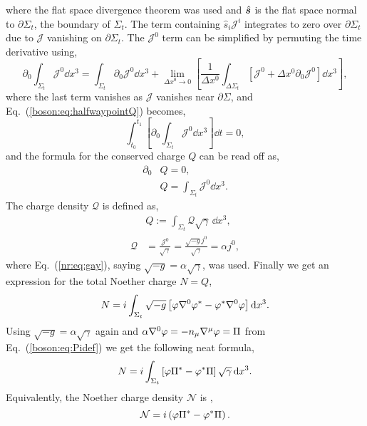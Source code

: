 where the flat space divergence theorem was used and $\hat{\boldsymbol{s}}$ is the flat space normal to $\partial \Sigma_t$, the boundary of $\Sigma_t$. The term containing $\hat{s}_i\mathcal{J}^i$ integrates to zero over $\partial \Sigma_t$ due to $\mathcal{J}$ vanishing on $\partial \Sigma_t$. The $\mathcal{J}^0$ term can be simplified by permuting the time derivative using,
\begin{equation} 
\partial_0 \int_{\Sigma_t}\mathcal{J}^0 \dd x^3 = \int_{\Sigma_t}\partial_0 \mathcal{J}^0 \dd x^3 + \lim_{\Delta x^0\rightarrow0}\left[ \frac{1}{\Delta x^0}\int_{\Delta \Sigma_t}\left[ \mathcal{J}^0 +\Delta x^0 \partial_0 \mathcal{J}^0\right] \dd x^3 \right],
\end{equation}
where the last term vanishes as $\mathcal{J}$ vanishes near $\partial\Sigma$, and Eq.~(\ref{boson:eq:halfwaypointQ}) becomes,
\begin{equation} 
\int^{t_1}_{t_0}\left[\partial_0 \int_{\Sigma_t} \mathcal{J}^0 \dd x^3 \right]\dd t = 0,
\end{equation} 
and the formula for the conserved charge $Q$ can be read off as,
\begin{align} 
\partial_0 &Q=0,\\
&Q = \int_{\Sigma_t}\mathcal{J}^0 \dd x^3 .
\end{align}
The charge density $\mathcal{Q}$ is defined as, 
\begin{align} 
&Q := \int_{\Sigma_t} \mathcal{Q}\sqrt{\gamma} \,\dd x^3 ,\\
\mathcal{Q}&= \frac{\mathcal{J}^0}{\sqrt{\gamma}} = \frac{\sqrt{-g}j^0}{\sqrt{\gamma}} = \alpha j^0,
\end{align}
where Eq.~(\ref{nr:eq:gay}), saying $\sqrt{-g}=\alpha\sqrt{\gamma}$, was used.
Finally we get an expression for the total Noether charge $N=Q$,
\begin{equation}
N =i \int_{\Sigma_t} \sqrt{-g}\left[ \varphi \nabla^0 \varphi^* - \varphi^*\nabla^0 \varphi\right] \dd x^3.
\end{equation}
Using $\sqrt{-g} = \alpha \sqrt{\gamma}$ again and $\alpha \nabla^0 \varphi = -n_\mu \nabla^\mu \varphi = \Pi$ from Eq.~(\ref{boson:eq:Pidef}) we get the following neat formula,
\begin{equation} 
N = i\int_{\Sigma_t}\left[ \varphi \Pi^*-\varphi^*\Pi\right] \sqrt{\gamma}\,\dd x^3.
\end{equation}
Equivalently, the Noether charge density $\mathcal{N}$ is ,
\begin{equation} 
\mathcal{N} = i\left( \varphi \Pi^*-\varphi^*\Pi\right) .
\end{equation}

